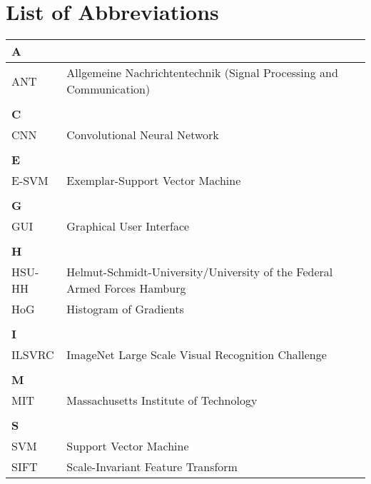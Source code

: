 \chapter*{List of Abbreviations}
\label{sec:abbreviations}
\begin{longtable}[t]{ll}
\arrayrulecolor{hsugrau}
\textbf{\textcolor{hsurot}{A}} &\\ \hline 
ANT & Allgemeine Nachrichtentechnik (Signal Processing and Communication)\\

  &\\ \textbf{\textcolor{hsurot}{C}} &\\  \hline 
 CNN & Convolutional Neural Network \\
 
   &\\ \textbf{\textcolor{hsurot}{E}} &\\  \hline 
 E-SVM & Exemplar-Support Vector Machine\\
 
    &\\ \textbf{\textcolor{hsurot}{G}} &\\  \hline 
 GUI & Graphical User Interface\\

  &\\ \textbf{\textcolor{hsurot}{H}} &\\  \hline 
HSU-HH & Helmut-Schmidt-University/University of the Federal Armed Forces Hamburg\\
HoG & Histogram of Gradients \\

  &\\ \textbf{\textcolor{hsurot}{I}} &\\  \hline 
ILSVRC & ImageNet Large Scale Visual Recognition Challenge\\

&\\ \textbf{\textcolor{hsurot}{M}} &\\  \hline 
MIT & Massachusetts Institute of Technology\\

&\\ \textbf{\textcolor{hsurot}{S}} &\\  \hline 
SVM & Support Vector Machine\\
SIFT & Scale-Invariant Feature Transform
\end{longtable}